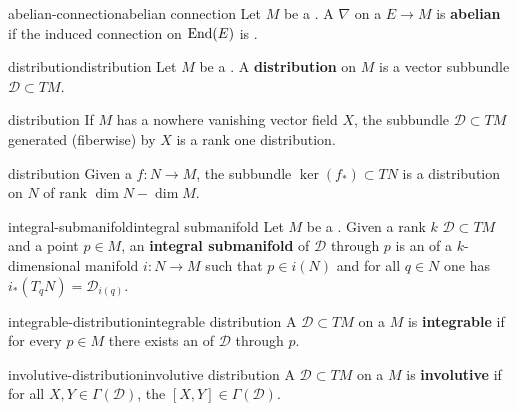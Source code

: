 \begin{topic}{abelian-connection}{abelian connection}
    Let $M$ be a . A  $\nabla$ on a  $E \to M$ is \textbf{abelian} if the induced connection on $\textup{End}(E)$ is .
\end{topic}

\begin{topic}{distribution}{distribution}
    Let $M$ be a . A \textbf{distribution} on $M$ is a vector subbundle $\mathcal{D} \subset TM$.
\end{topic}

\begin{example}{distribution}
    If $M$ has a nowhere vanishing vector field $X$, the subbundle $\mathcal{D} \subset TM$ generated (fiberwise) by $X$ is a rank one distribution.
\end{example}

\begin{example}{distribution}
    Given a  $f : N \to M$, the subbundle $\ker(f_*) \subset TN$ is a distribution on $N$ of rank $\dim N - \dim M$.
\end{example}

\begin{topic}{integral-submanifold}{integral submanifold}
    Let $M$ be a . Given a rank $k$  $\mathcal{D} \subset TM$ and a point $p \in M$, an \textbf{integral submanifold} of $\mathcal{D}$ through $p$ is an  of a $k$-dimensional manifold $i : N \to M$ such that $p \in i(N)$ and for all $q \in N$ one has $i_*(T_q N) = \mathcal{D}_{i(q)}$.
\end{topic}

\begin{topic}{integrable-distribution}{integrable distribution}
    A  $\mathcal{D} \subset TM$ on a  $M$ is \textbf{integrable} if for every $p \in M$ there exists an  of $\mathcal{D}$ through $p$.
\end{topic}

\begin{topic}{involutive-distribution}{involutive distribution}
    A  $\mathcal{D} \subset TM$ on a  $M$ is \textbf{involutive} if for all $X, Y \in \Gamma(\mathcal{D})$, the  $[X, Y] \in \Gamma(\mathcal{D})$.
\end{topic}


